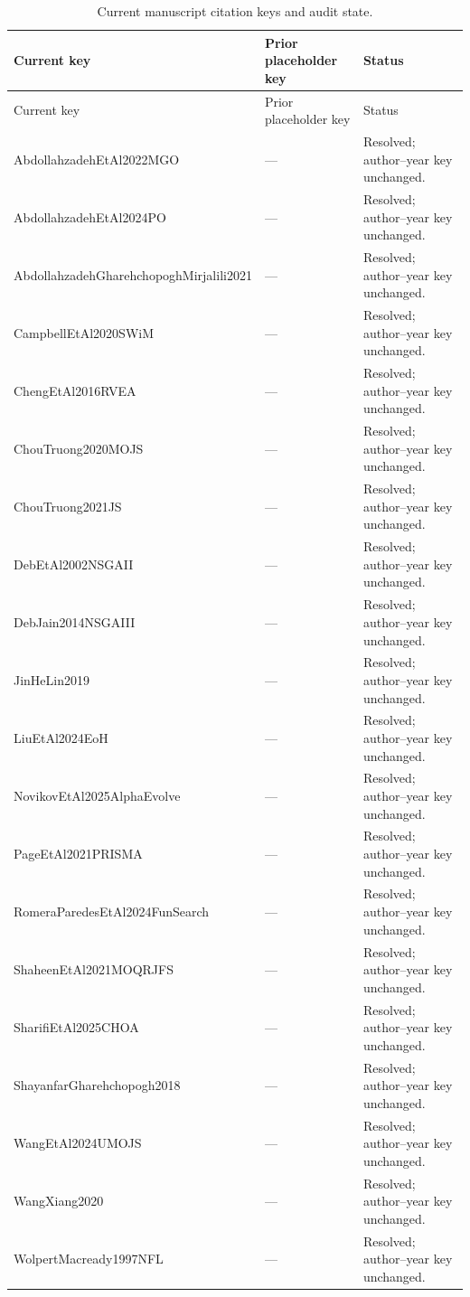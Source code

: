 \documentclass[9pt]{article}
\begin{document}
\small
\begin{longtable}{P{5.4cm}P{4.0cm}P{4.4cm}}
\caption{Current manuscript citation keys and audit state.}\label{tab:s8-keys}\\
\toprule Current key & Prior placeholder key & Status\\\midrule\endfirsthead
\toprule Current key & Prior placeholder key & Status\\\midrule\endhead
AbdollahzadehEtAl2022MGO & --- & Resolved; author--year key unchanged. \\
AbdollahzadehEtAl2024PO & --- & Resolved; author--year key unchanged. \\
AbdollahzadehGharehchopoghMirjalili2021 & --- & Resolved; author--year key unchanged. \\
CampbellEtAl2020SWiM & --- & Resolved; author--year key unchanged. \\
ChengEtAl2016RVEA & --- & Resolved; author--year key unchanged. \\
ChouTruong2020MOJS & --- & Resolved; author--year key unchanged. \\
ChouTruong2021JS & --- & Resolved; author--year key unchanged. \\
DebEtAl2002NSGAII & --- & Resolved; author--year key unchanged. \\
DebJain2014NSGAIII & --- & Resolved; author--year key unchanged. \\
JinHeLin2019 & --- & Resolved; author--year key unchanged. \\
LiuEtAl2024EoH & --- & Resolved; author--year key unchanged. \\
NovikovEtAl2025AlphaEvolve & --- & Resolved; author--year key unchanged. \\
PageEtAl2021PRISMA & --- & Resolved; author--year key unchanged. \\
RomeraParedesEtAl2024FunSearch & --- & Resolved; author--year key unchanged. \\
ShaheenEtAl2021MOQRJFS & --- & Resolved; author--year key unchanged. \\
SharifiEtAl2025CHOA & --- & Resolved; author--year key unchanged. \\
ShayanfarGharehchopogh2018 & --- & Resolved; author--year key unchanged. \\
WangEtAl2024UMOJS & --- & Resolved; author--year key unchanged. \\
WangXiang2020 & --- & Resolved; author--year key unchanged. \\
WolpertMacready1997NFL & --- & Resolved; author--year key unchanged. \\

\end{longtable}
\end{document}
